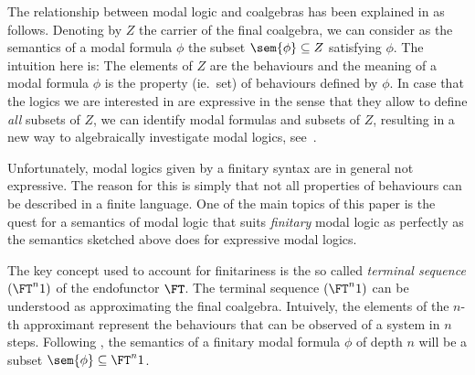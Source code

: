\documentclass{entcs}
\begin{document}
The relationship between modal logic and coalgebras
has been explained in \cite{kurz:aiml98} as follows. Denoting by $Z$
the carrier of the final coalgebra, we can consider as the semantics
of a modal formula $\phi$ the subset $\sem{\phi}\subseteq Z$
satisfying $\phi$.
%
The intuition here is: The elements of $Z$ are the
behaviours %
and the meaning of a modal formula $\phi$ is the property (ie.\ set)
of behaviours defined by $\phi$.
%
In case that the logics we are interested in are expressive in the
sense that they allow to define \emph{all} subsets of $Z$, we can
identify modal formulas and subsets of $Z$, resulting in a new way to
algebraically investigate modal logics,
see~\cite{kurz:aiml98,kurz:cmcs01}.

Unfortunately, modal logics given by a finitary syntax are in general
not expressive. 
The reason for this is simply that not all properties of behaviours
can be described in a finite language. One of the main topics of this
paper is the quest for a semantics of modal logic that suits
\emph{finitary} modal logic as perfectly as the semantics sketched
above does for expressive modal logics.



The key concept used to account for finitariness is the so called
\emph{terminal sequence} $(\FT^n 1)$ of the endofunctor $\FT$. The
terminal sequence $(\FT^n 1)$ can be understood as approximating the
final coalgebra. Intuively, the elements of the $n$-th approximant
represent the behaviours that can be observed of a system in $n$
steps. Following \cite{pattinson:sem-mod,pattinson:cml-report}, the
semantics of a finitary modal formula $\phi$ of depth $n$ will be a
subset $\sem{\phi}\subseteq\FT^n 1$.
\end{document}
